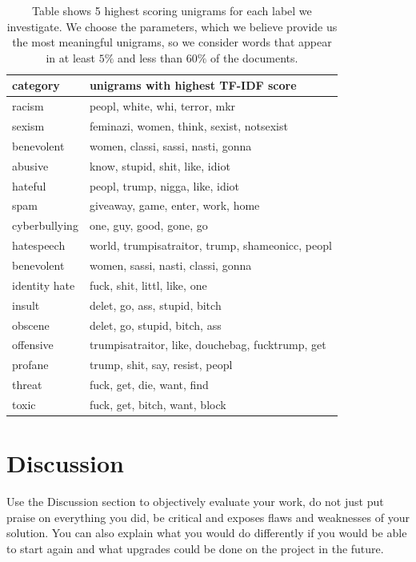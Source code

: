\documentclass[fleqn,moreauthors,10pt]{ds_report}
\begin{document}
\begin{table}[htb]
\scriptsize
\centering
\begin{tabular}{l|l}
\toprule
\textbf{category}   & \textbf{unigrams with highest TF-IDF score} \\ \midrule
racism     & peopl, white, whi, terror, mkr                \\ \hline
sexism     & feminazi, women, think, sexist, notsexist                \\ \hline
benevolent & women, classi, sassi, nasti, gonna            \\ \hline
abusive    & know, stupid, shit, like, idiot  \\ \hline
hateful    & peopl, trump, nigga, like, idiot    \\ \hline
spam       & giveaway, game, enter, work, home            \\ \hline
cyberbullying       & one, guy, good, gone, go             \\ \hline
hatespeech      & world, trumpisatraitor, trump, shameonicc, peopl             \\ \hline
benevolent       & women, sassi, nasti, classi, gonna           \\ \hline
identity hate       & fuck, shit, littl, like, one             \\ \hline
insult       & delet, go, ass, stupid, bitch        \\ \hline
obscene       & delet, go, stupid, bitch, ass             \\ \hline
offensive       & trumpisatraitor, like, douchebag, fucktrump, get            \\ \hline
profane       & trump, shit, say, resist, peopl             \\ \hline
threat       & fuck, get, die, want, find           \\ \hline
toxic       & fuck, get, bitch, want, block             \\ \bottomrule
\end{tabular}
\caption{Table shows 5 highest scoring unigrams for each label we investigate. We choose the parameters, which we believe provide us the most meaningful unigrams, so we consider words that appear in at least $5\%$ and less than $60\%$ of the documents.}
\label{tab:tf-idf}
\end{table}

\section*{Discussion}

Use the Discussion section to objectively evaluate your work, do not just put praise on everything you did, be critical and exposes flaws and weaknesses of your solution. You can also explain what you would do differently if you would be able to start again and what upgrades could be done on the project in the future.




\end{document}
